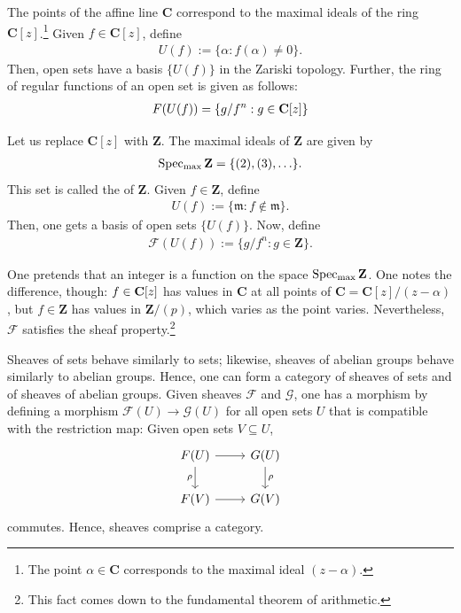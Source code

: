 \documentclass [11 pt, oneside] {article}
\begin{document}
\begin{example}[ ]\label{}\text{}
The points of the affine line $\mathbf{C}$ correspond to the maximal ideals of the ring $\mathbf{C}[z]$.\footnote{The point $\alpha\in \mathbf{C}$ corresponds to the maximal ideal $(z-\alpha)$.} Given $f\in \mathbf{C}[z]$, define
\begin{align*}
	U(f) := \{\alpha : f(\alpha)\ne 0\}.
\end{align*}
Then, open sets have a basis $\{U(f)\}$ in the Zariski topology. Further, the ring of regular functions of an open set is given as follows: 
\begin{align*}
	\relax{F}(U(f)) = \{g/f^n: g\in \mathbf C[z]\}
\end{align*}

Let us replace $\mathbf{C}[z]$ with $\mathbf{Z}$. The maximal ideals of $\mathbf{Z}$ are given by
\begin{align*}
	\operatorname{Spec\textsubscript{max}}\mathbf{Z} = \{(2),  (3),\hdots\}.
\end{align*}
This set is called the  of $\mathbf{Z}$. Given $f\in \mathbf{Z}$, define 
\begin{align*}
	U(f) := \{\mathfrak{m}: f\notin  \mathfrak{m}\}.
\end{align*}
Then, one gets a basis of open sets $\{U(f)\}$. Now, define
\begin{align*}
	\mathscr{F}(U(f)) := \{ g/f^n : g\in \mathbf{Z}\}.
\end{align*}

One pretends that an integer is a function on the space $\operatorname{Spec\textsubscript{max}} \mathbf{Z}$. One notes the difference, though: $f\in \mathbf C[z]$ has values in $\mathbf{C}$ at all points of $\mathbf{C} = \mathbf{C}[z]/(z-\alpha)$, but $f\in \mathbf{Z}$ has values in $\mathbf{Z}/(p)$, which varies as the point varies. Nevertheless, $\mathscr{F}$ satisfies the sheaf property.\footnote{This fact comes down to the fundamental theorem of arithmetic.}
\end{example}

Sheaves of sets behave similarly to sets; likewise, sheaves of abelian groups behave similarly to abelian groups. Hence, one can form a category of sheaves of sets and of sheaves of abelian groups. Given sheaves $\mathscr{F}$ and $\mathscr{G}$, one has a morphism by defining a morphism $\mathscr{F}(U) \longrightarrow \mathscr{G}(U)$ for all open sets $U$ that is compatible with the restriction map: Given open sets $V\subseteq U$,
\[
\begin{tikzcd}
	\mathscr{F}(U)\ar[d,"\rho", swap] \ar[r]&  \mathscr{G}(U)  \ar[d,"\rho"] \\
	\mathscr{F}(V) \ar[r]&  \mathscr{G}(V)
\end{tikzcd}
\]
commutes. Hence, sheaves comprise a category.
\end{document}
